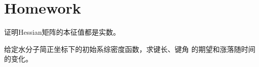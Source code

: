     \section{Homework}
    \begin{asg}
        证明Hessian矩阵的本征值都是实数。
    \end{asg}
    \begin{asg}
        给定水分子简正坐标下的初始系综密度函数，求键长、键角
        的期望和涨落随时间的变化。
    \end{asg}


    
    
